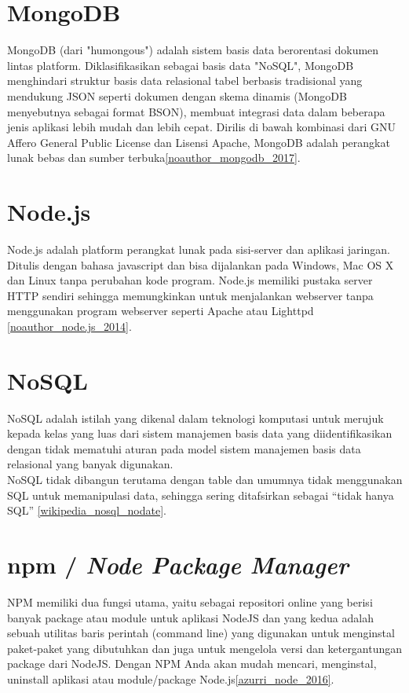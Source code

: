 	
	\section{MongoDB}
	MongoDB (dari "humongous") adalah sistem basis data berorentasi dokumen lintas platform. Diklasifikasikan sebagai basis data "NoSQL", MongoDB menghindari struktur basis data relasional tabel berbasis tradisional yang mendukung JSON seperti dokumen dengan skema dinamis (MongoDB menyebutnya sebagai format BSON), membuat integrasi data dalam beberapa jenis aplikasi lebih mudah dan lebih cepat. Dirilis di bawah kombinasi dari GNU Affero General Public License dan Lisensi Apache, MongoDB adalah perangkat lunak bebas dan sumber terbuka\ref{noauthor_mongodb_2017}.
	    
	\section{Node.js}
	Node.js adalah platform perangkat lunak pada sisi-server dan aplikasi jaringan. Ditulis dengan bahasa javascript dan bisa dijalankan pada Windows, Mac OS X dan Linux tanpa perubahan kode program. Node.js memiliki pustaka server HTTP sendiri sehingga memungkinkan untuk menjalankan webserver tanpa menggunakan program webserver seperti Apache atau Lighttpd \ref{noauthor_node.js_2014}.
	    
	\section{NoSQL}
	NoSQL adalah istilah yang dikenal dalam teknologi komputasi untuk merujuk kepada kelas yang luas dari sistem manajemen basis data yang diidentifikasikan dengan tidak mematuhi aturan pada model sistem manajemen basis data relasional yang banyak digunakan.
	\\ \indent
	NoSQL tidak dibangun terutama dengan table dan umumnya tidak menggunakan SQL untuk memanipulasi data, sehingga sering ditafsirkan sebagai “tidak hanya SQL” \ref{wikipedia_nosql_nodate}.

	\section{npm / \textit{Node Package Manager}}
	NPM memiliki dua fungsi utama, yaitu sebagai repositori online yang berisi banyak package atau module untuk aplikasi NodeJS dan yang kedua adalah sebuah utilitas baris perintah (command line) yang digunakan untuk menginstal paket-paket yang dibutuhkan dan juga untuk mengelola versi dan ketergantungan package dari NodeJS. Dengan NPM Anda akan mudah mencari, menginstal, uninstall aplikasi atau module/package Node.js\ref{azurri_node_2016}.
	

